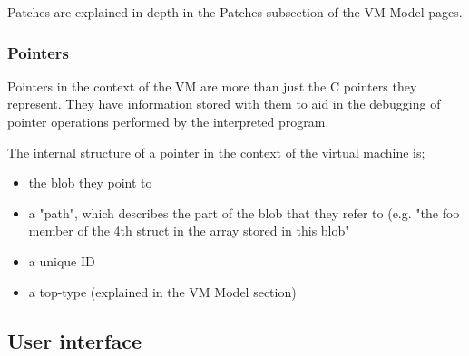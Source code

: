 \documentclass[a4paper]{report}
\begin{document}
Patches are explained in depth in the Patches subsection of the VM Model pages.
\subsubsection{Pointers}
Pointers in the context of the VM are more than just the C pointers they represent. They have information stored with them to aid in the debugging of pointer operations performed by the interpreted program.

The internal structure of a pointer in the context of the virtual machine is;
\begin{itemize}
\item the blob they point to 
\item a "path", which describes the part of the blob that they refer to (e.g. "the foo member of the 4th struct in the array stored in this blob"
\item a unique ID
\item a top-type (explained in the VM Model section)
\end{itemize}

\subsection{User interface}






\appendix



\end{document}
